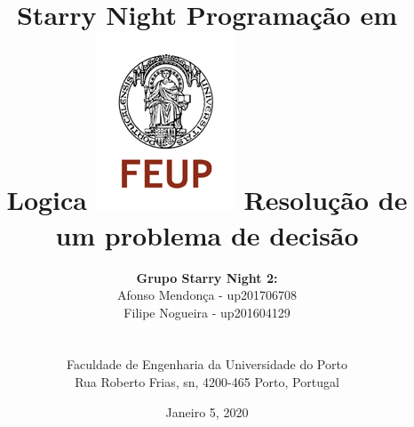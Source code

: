 \documentclass[a4paper]{article}
\begin{document}
\setlength{\textwidth}{16cm}
\setlength{\textheight}{22cm}

\title{\Huge\textbf{Starry Night}\linebreak\linebreak\linebreak
\Large\textbf{Programação em Logica}\linebreak\linebreak
\linebreak\linebreak
\includegraphics[scale=0.9]{img/feup-logo.png}\linebreak\linebreak
\linebreak\linebreak
\Large{Resolução de um problema de decisão}\linebreak
}

\author{\textbf{Grupo Starry Night 2:}\\ Afonso Mendonça - up201706708 \\ Filipe Nogueira - up201604129 \\\linebreak\linebreak \\
 \\ Faculdade de Engenharia da Universidade do Porto \\ Rua Roberto Frias, s\/n, 4200-465 Porto, Portugal \linebreak\linebreak\linebreak
\linebreak\linebreak\vspace{1cm}}
\date{Janeiro 5, 2020}
\maketitle
\thispagestyle{empty}

\end{document}
